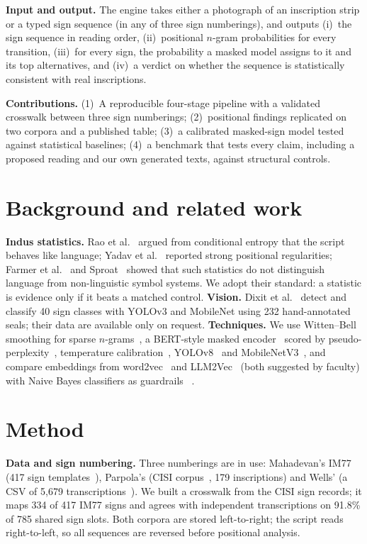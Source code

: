 \documentclass[11pt,a4paper,twocolumn]{article}
\begin{document}
\textbf{Input and output.} The engine takes either a photograph of an inscription strip or a typed sign
sequence (in any of three sign numberings), and outputs (i)~the sign sequence in reading order,
(ii)~positional $n$-gram probabilities for every transition, (iii)~for every sign, the probability a
masked model assigns to it and its top alternatives, and (iv)~a verdict on whether the sequence is
statistically consistent with real inscriptions.

\textbf{Contributions.} (1)~A reproducible four-stage pipeline with a validated crosswalk between three
sign numberings; (2)~positional findings replicated on two corpora and a published table; (3)~a
calibrated masked-sign model tested against statistical baselines; (4)~a benchmark that tests every
claim, including a proposed reading and our own generated texts, against structural controls.

\section{Background and related work}
\textbf{Indus statistics.} Rao et al.~\cite{rao2009} argued from conditional entropy that the script
behaves like language; Yadav et al.~\cite{yadav2010} reported strong positional regularities; Farmer
et al.~\cite{farmer2004} and Sproat~\cite{sproat2014} showed that such statistics do not distinguish
language from non-linguistic symbol systems. We adopt their standard: a statistic is evidence only if it
beats a matched control. \textbf{Vision.} Dixit et al.~\cite{dixit2025} detect and
classify 40 sign classes with YOLOv3 and MobileNet using 232 hand-annotated seals; their data are
available only on request. \textbf{Techniques.} We use Witten--Bell smoothing for sparse
$n$-grams~\cite{wittenbell1991}, a BERT-style masked encoder~\cite{devlin2019} scored by
pseudo-perplexity~\cite{salazar2020}, temperature calibration~\cite{guo2017}, YOLOv8~\cite{yolov8} and
MobileNetV3~\cite{howard2019}, and compare embeddings from word2vec~\cite{mikolov2013} and
LLM2Vec~\cite{llm2vec2024} (both suggested by faculty) with Naive Bayes classifiers as guardrails
~\cite{russell2021aima}.

\section{Method}
\textbf{Data and sign numbering.} Three numberings are in use: Mahadevan's IM77~\cite{mahadevan1977}
(417 sign templates~\cite{im417}), Parpola's (CISI corpus~\cite{cisi1987}, 179 inscriptions) and Wells'
(a CSV of 5,679 transcriptions~\cite{csvsource}). We built a crosswalk from the CISI sign records; it
maps 334 of 417 IM77 signs and agrees with independent transcriptions on 91.8\% of 785 shared sign
slots. Both corpora are stored left-to-right; the script reads right-to-left, so all sequences are
reversed before positional analysis.
\end{document}
